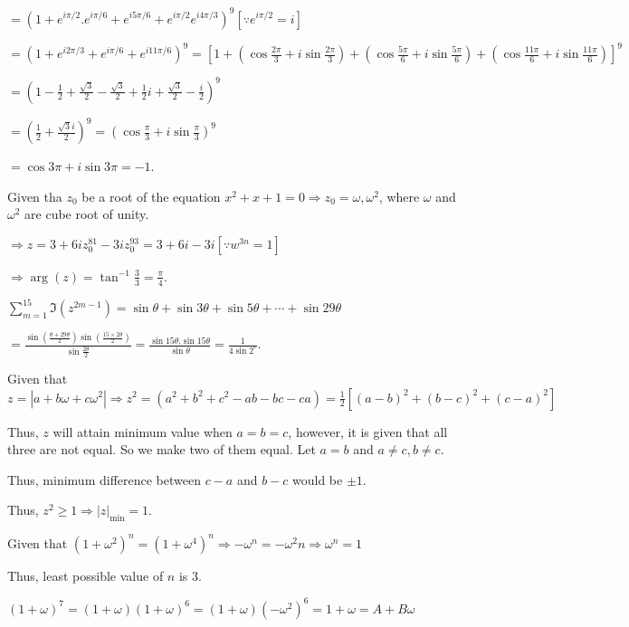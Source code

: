   $= \left(1 + e^{i\pi/2}.e^{i\pi/6} + e^{i5\pi/6} + e^{i\pi/2}e^{i4\pi/3}\right)^9\left[\because e^{i\pi/2}
    = i\right]$

  $= \left(1 + e^{i2\pi/3} + e^{i\pi/6} + e^{i11\pi/6}\right)^9 = \left[1 + \left(\cos\frac{2\pi}{3} +
    i\sin\frac{2\pi}{3}\right) + \left(\cos\frac{5\pi}{6} + i\sin\frac{5\pi}{6}\right) + \left(\cos\frac{11\pi}{6}
    + i\sin\frac{11\pi}{6}\right)\right]^9$

  $= \left(1 - \frac{1}{2} + \frac{\sqrt{3}}{2} - \frac{\sqrt{3}}{2} + \frac{1}{2}i + \frac{\sqrt{3}}{2}
  - \frac{i}{2}\right)^9$

  $= \left(\frac{1}{2} + \frac{\sqrt{3}i}{2}\right)^9 = \left(\cos\frac{\pi}{3} +
  i\sin\frac{\pi}{3}\right)^9$

  $ = \cos3\pi + i\sin3\pi = -1$.
\item Given tha $z_0$ be a root of the equation $x^2 + x + 1 = 0\Rightarrow z_0 = \omega, \omega^2$, where
  $\omega$ and $\omega^2$ are cube root of unity.

  $\Rightarrow z = 3 + 6iz_0^{81} - 3iz_0^{93} = 3 + 6i - 3i[\because w^{3n} = 1]$

  $\Rightarrow \arg(z) = \tan^{-1}\frac{3}{3} = \frac{\pi}{4}$.
\item $\displaystyle\sum_{m = 1}^{15}\Im\left(z^{2m - 1}\right) = \sin\theta + \sin3\theta + \sin5\theta
  + \cdots + \sin29\theta$

  $= \frac{\sin\left(\frac{\theta +
      29\theta}{2}\right)\sin\left(\frac{15\times2\theta}{2}\right)}{\sin\frac{2\theta}{2}}
  = \frac{\sin15\theta.\sin15\theta}{\sin\theta} = \frac{1}{4\sin2^\circ}$.
\item Given that $z = |a + b\omega + c\omega^2|\Rightarrow z^2 = (a^2 + b^2 + c^2 - ab - bc - ca)
  = \frac{1}{2}\left[(a - b)^2 + (b - c)^2 + (c - a)^2\right]$

  Thus, $z$ will attain minimum value when $a = b = c$, however, it is given that all three are not
  equal. So we make two of them equal. Let $a = b$ and $a\neq c, b\neq c$.

  Thus, minimum difference between $c - a$ and $b - c$ would be $\pm1$.

  Thus, $z^2 \geq 1\Rightarrow |z|_{\min} = 1$.
\item Given that $(1 + \omega^2)^n = (1 + \omega^4)^n\Rightarrow -\omega^n = -\omega^2n \Rightarrow \omega^n
  = 1$

  Thus, least possible value of $n$ is $3$.
\item $(1 + \omega)^7 = (1 + \omega)(1 + \omega)^6 = (1 + \omega)(-\omega^2)^6 = 1 + \omega = A + B\omega$

